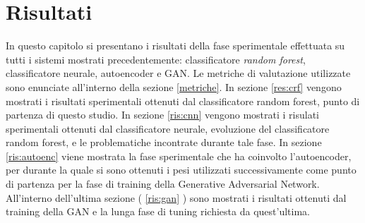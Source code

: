 \chapter{Risultati}
In questo capitolo si presentano i risultati della fase sperimentale effettuata su tutti i sistemi mostrati precedentemente: classificatore \textit{random forest}, classificatore neurale, autoencoder e GAN. Le metriche di valutazione utilizzate sono enunciate all'interno della sezione \ref{metriche}. In sezione \ref{res:crf} vengono mostrati i risultati sperimentali ottenuti dal classificatore random forest, punto di partenza di questo studio. In sezione \ref{ris:cnn} vengono mostrati i risulati sperimentali ottenuti dal classificatore neurale, evoluzione del classificatore random forest, e le problematiche incontrate durante tale fase. In sezione \ref{ris:autoenc} viene mostrata la fase sperimentale che ha coinvolto l'autoencoder, per durante la quale si sono ottenuti i pesi utilizzati successivamente come punto di partenza per la fase di training della Generative Adversarial Network. All'interno dell'ultima sezione ( \ref{ris:gan} ) sono mostrati i risultati ottenuti dal training della GAN e la lunga fase di tuning richiesta da quest'ultima.

\pagebreak
